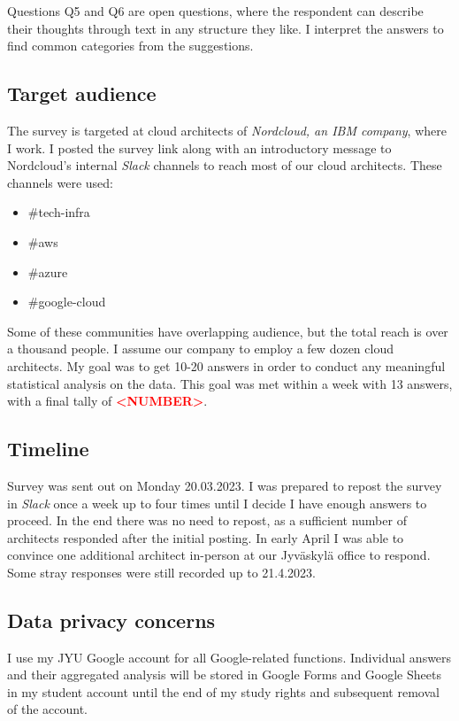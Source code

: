 \documentclass[utf8,english]{gradu3}
\newcommand{\todo}[1]{\textbf{\textcolor{red}{#1}}}
\begin{document}
Questions Q5 and Q6 are open questions, where the respondent can describe their
thoughts through text in any structure they like.
I interpret the answers to find common categories from the suggestions.

\subsection{Target audience}
The survey is targeted at cloud architects of \textit{Nordcloud, an IBM company}, where I work.
I posted the survey link along with an introductory message to Nordcloud's
internal \textit{Slack} channels to reach most of our cloud architects.
These channels were used:
\begin{itemize}
  \item \#tech-infra
  \item \#aws
  \item \#azure
  \item \#google-cloud
\end{itemize}

Some of these communities have overlapping audience, but the total reach is over a thousand people.
I assume our company to employ a few dozen cloud architects.
My goal was to get 10-20 answers in order to conduct any meaningful statistical analysis on
the data.
This goal was met within a week with 13 answers, with a final tally of \todo{<NUMBER>}.

\subsection{Timeline}
Survey was sent out on Monday 20.03.2023.
I was prepared to repost the survey in \textit{Slack} once a week up to four times until I
decide I have enough answers to proceed.
In the end there was no need to repost, as a sufficient number of architects
responded after the initial posting.
In early April I was able to convince one additional architect in-person at our
Jyväskylä office to respond.
Some stray responses were still recorded up to 21.4.2023.

\subsection{Data privacy concerns}
I use my JYU Google account for all Google-related functions.
Individual answers and their aggregated analysis will be stored in Google Forms and
Google Sheets in my student account until the end of my study rights and
subsequent removal of the account.
\end{document}
